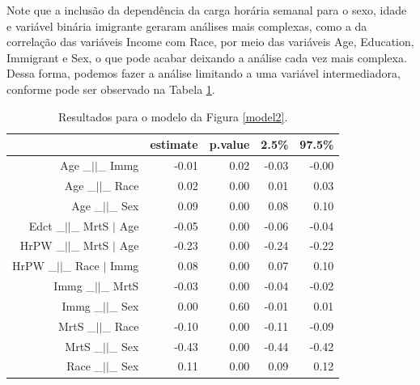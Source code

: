 \documentclass[11pt,letterpaper,twocolumn]{article}
\begin{document}
Note que a inclusão da dependência da carga horária semanal para o sexo, idade e variável binária imigrante geraram análises mais complexas, como a da correlação das variáveis Income com Race, por meio das variáveis Age, Education, Immigrant e Sex, o que pode acabar deixando a análise cada vez mais complexa. Dessa forma, podemos fazer a análise limitando a uma variável intermediadora, conforme pode ser observado na Tabela \ref{r2m2}.
\begin{table}[ht]
    \centering
    \begin{tabular}{rrrrr}
        \hline
        & estimate & p.value & 2.5\% & 97.5\% \\ 
        \hline
        Age \_$||$\_ Immg & -0.01 & 0.02 & -0.03 & -0.00 \\ 
        Age \_$||$\_ Race & 0.02 & 0.00 & 0.01 & 0.03 \\ 
        Age \_$||$\_ Sex & 0.09 & 0.00 & 0.08 & 0.10 \\ 
        Edct \_$||$\_ MrtS $|$ Age & -0.05 & 0.00 & -0.06 & -0.04 \\ 
        HrPW \_$||$\_ MrtS $|$ Age & -0.23 & 0.00 & -0.24 & -0.22 \\ 
        HrPW \_$||$\_ Race $|$ Immg & 0.08 & 0.00 & 0.07 & 0.10 \\ 
        Immg \_$||$\_ MrtS & -0.03 & 0.00 & -0.04 & -0.02 \\ 
        Immg \_$||$\_ Sex & 0.00 & 0.60 & -0.01 & 0.01 \\ 
        MrtS \_$||$\_ Race & -0.10 & 0.00 & -0.11 & -0.09 \\ 
        MrtS \_$||$\_ Sex & -0.43 & 0.00 & -0.44 & -0.42 \\ 
        Race \_$||$\_ Sex & 0.11 & 0.00 & 0.09 & 0.12 \\ 
        \hline
    \end{tabular}
    \caption{Resultados para o modelo da Figura \ref{model2}.}
    \label{r2m2}
\end{table}
\end{document}
